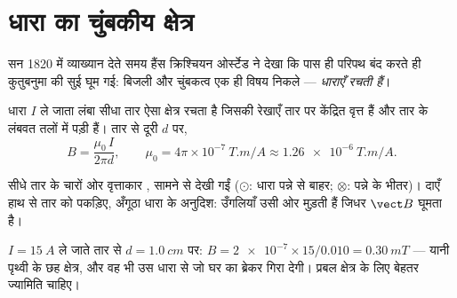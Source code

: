 \section{धारा का चुंबकीय क्षेत्र}

\begin{remark}[ओर्स्टेड, 1820]\label{rem:g11:magnetic-fields:oersted}
सन 1820 में व्याख्यान देते समय हैंस क्रिश्चियन ओर्स्टेड ने देखा कि पास ही
परिपथ बंद करते ही कुतुबनुमा की सुई घूम गई: बिजली और चुंबकत्व एक ही विषय निकले
--- \emph{धाराएँ  रचती हैं}।
\end{remark}

\begin{proposition}[सीधे तार का क्षेत्र]\label{prop:g11:magnetic-fields:wire}
धारा $I$ ले जाता लंबा सीधा तार ऐसा क्षेत्र रचता है जिसकी रेखाएँ
तार पर केंद्रित वृत्त हैं और तार के लंबवत तलों में पड़ी हैं। तार से दूरी
$d$ पर,
\[
B = \frac{\mu_0\, I}{2\pi d},
\qquad \mu_0 = 4\pi\times 10^{-7}\ \unit{T.m/A} \approx \qty{1.26e-6}{T.m/A}.
\]
\end{proposition}
\admitted

\begin{omfigure}
\qquad\qquad
{}

{\small सीधे तार के चारों ओर वृत्ताकार , सामने से देखी
गईं ($\odot$: धारा पन्ने से बाहर; $\otimes$: पन्ने के भीतर)। दाएँ हाथ से तार को
पकड़िए, अँगूठा धारा के अनुदिश: उँगलियाँ उसी ओर मुड़ती हैं जिधर $\vect B$ घूमता
है।}
\end{omfigure}

\begin{example}[तार एक कमज़ोर चुंबक है]\label{ex:g11:magnetic-fields:wire}
$I = \qty{15}{A}$ ले जाते तार से $d = \qty{1.0}{cm}$ पर: $B = \num{2e-7} \times 15 / 0.010 = \qty{0.30}{mT}$ --- यानी पृथ्वी के छह
क्षेत्र, और वह भी उस धारा से जो घर का ब्रेकर गिरा देगी। प्रबल
क्षेत्र के लिए बेहतर ज्यामिति चाहिए।
\end{example}

